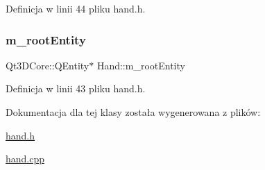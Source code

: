 Definicja w linii 44 pliku hand.\+h.

\mbox{\label{class_hand_a27c80e86783b9066e5aff6b357dc9d78}} 
\subsubsection{\texorpdfstring{m\+\_\+root\+Entity}{m\_rootEntity}}
{\footnotesize\ttfamily Qt3\+D\+Core\+::\+Q\+Entity$\ast$ Hand\+::m\+\_\+root\+Entity\hspace{0.3cm}{\ttfamily [protected]}}



Definicja w linii 43 pliku hand.\+h.



Dokumentacja dla tej klasy została wygenerowana z plików\+:\begin{DoxyCompactItemize}
\item 
\hyperlink{hand_8h}{hand.\+h}\item 
\hyperlink{hand_8cpp}{hand.\+cpp}\end{DoxyCompactItemize}
